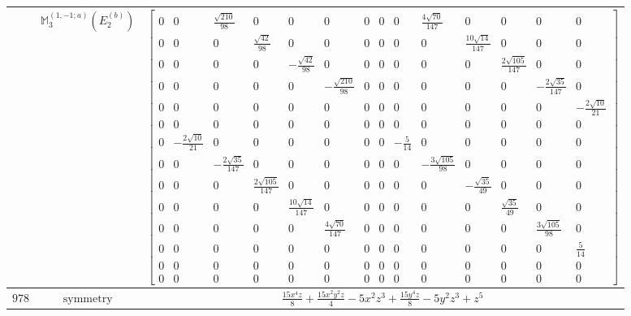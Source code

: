 \documentclass[fleqn,8pt,landscape]{jsarticle}
\begin{document}
\begin{longtable}{ccc}
$  $ & $ \mathbb{M}_{3}^{(1,-1;a)}(E_{2}^{(b)}) $ & $ \begin{bmatrix} 0 & 0 & \frac{\sqrt{210}}{98} & 0 & 0 & 0 & 0 & 0 & 0 & \frac{4 \sqrt{70}}{147} & 0 & 0 & 0 & 0 \\ 0 & 0 & 0 & \frac{\sqrt{42}}{98} & 0 & 0 & 0 & 0 & 0 & 0 & \frac{10 \sqrt{14}}{147} & 0 & 0 & 0 \\ 0 & 0 & 0 & 0 & - \frac{\sqrt{42}}{98} & 0 & 0 & 0 & 0 & 0 & 0 & \frac{2 \sqrt{105}}{147} & 0 & 0 \\ 0 & 0 & 0 & 0 & 0 & - \frac{\sqrt{210}}{98} & 0 & 0 & 0 & 0 & 0 & 0 & - \frac{2 \sqrt{35}}{147} & 0 \\ 0 & 0 & 0 & 0 & 0 & 0 & 0 & 0 & 0 & 0 & 0 & 0 & 0 & - \frac{2 \sqrt{10}}{21} \\ 0 & 0 & 0 & 0 & 0 & 0 & 0 & 0 & 0 & 0 & 0 & 0 & 0 & 0 \\ 0 & - \frac{2 \sqrt{10}}{21} & 0 & 0 & 0 & 0 & 0 & 0 & - \frac{5}{14} & 0 & 0 & 0 & 0 & 0 \\ 0 & 0 & - \frac{2 \sqrt{35}}{147} & 0 & 0 & 0 & 0 & 0 & 0 & - \frac{3 \sqrt{105}}{98} & 0 & 0 & 0 & 0 \\ 0 & 0 & 0 & \frac{2 \sqrt{105}}{147} & 0 & 0 & 0 & 0 & 0 & 0 & - \frac{\sqrt{35}}{49} & 0 & 0 & 0 \\ 0 & 0 & 0 & 0 & \frac{10 \sqrt{14}}{147} & 0 & 0 & 0 & 0 & 0 & 0 & \frac{\sqrt{35}}{49} & 0 & 0 \\ 0 & 0 & 0 & 0 & 0 & \frac{4 \sqrt{70}}{147} & 0 & 0 & 0 & 0 & 0 & 0 & \frac{3 \sqrt{105}}{98} & 0 \\ 0 & 0 & 0 & 0 & 0 & 0 & 0 & 0 & 0 & 0 & 0 & 0 & 0 & \frac{5}{14} \\ 0 & 0 & 0 & 0 & 0 & 0 & 0 & 0 & 0 & 0 & 0 & 0 & 0 & 0 \\ 0 & 0 & 0 & 0 & 0 & 0 & 0 & 0 & 0 & 0 & 0 & 0 & 0 & 0 \end{bmatrix} $ \\ \hline
$ 978 $ & $ \text{symmetry} $ & $ \frac{15 x^{4} z}{8} + \frac{15 x^{2} y^{2} z}{4} - 5 x^{2} z^{3} + \frac{15 y^{4} z}{8} - 5 y^{2} z^{3} + z^{5} $ \\

\end{longtable}
\end{document}
